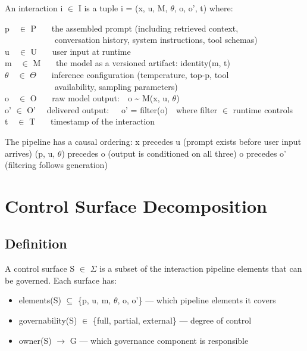 \begin{cdef}
An interaction i $\in$ I is a tuple i = (x, u, M, $\theta$, o, o', t) where:

\begin{cladnote}
p~~$\in$ P~~~\textemdash{} the assembled prompt (including retrieved context,\\
~~~~~~~~~~~~conversation history, system instructions, tool schemas)\\
u~~$\in$ U~~~\textemdash{} user input at runtime\\
m~~$\in$ M~~~\textemdash{} the model as a versioned artifact: identity(m, t)\\
$\theta$~~$\in$ $\Theta$~~~\textemdash{} inference configuration (temperature, top-p, tool\\
~~~~~~~~~~~~availability, sampling parameters)\\
o~~$\in$ O~~~\textemdash{} raw model output:~~o \textasciitilde{} M(x, u, $\theta$)\\
o' $\in$ O'~~\textemdash{} delivered output:~~~o' = filter(o)~~where filter $\in$ runtime controls\\
t~~$\in$ T~~~\textemdash{} timestamp of the interaction\\
\end{cladnote}
The pipeline has a causal ordering: x precedes u  (prompt exists before user input arrives) (p, u, $\theta$) precedes o  (output is conditioned on all three) o precedes o'  (filtering follows generation)

\end{cdef}




\section{Control Surface Decomposition}
\label{sec:framework-4}


\subsection{Definition}


\begin{cdef}
A control surface S $\in$ $\Sigma$ is a subset of the interaction pipeline elements that can be governed. Each surface has:

\begin{itemize}
  \item elements(S) $\subseteq$ \{p, u, m, $\theta$, o, o'\}  --- which pipeline elements it covers
  \item governability(S) $\in$ \{full, partial, external\}  --- degree of control
  \item owner(S) $\to$ G  --- which governance component is responsible
\end{itemize}

\end{cdef}


